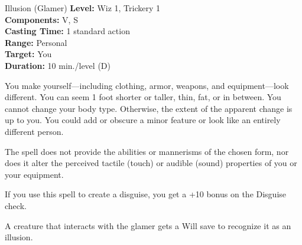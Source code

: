 {Illusion (Glamer)}
{
	\textbf{Level:}
	Wiz 1, Trickery 1\\
	\textbf{Components:}
	V, S\\
	\textbf{Casting Time:}
	1 standard action\\
	\textbf{Range:}
	Personal\\
	\textbf{Target:}
	You\\
	\textbf{Duration:}
	10 min./level (D)\\
}
{
	You make yourself---including clothing, armor, weapons, and equipment---look different. You can seem 1 foot shorter or taller, thin, fat, or in between. You cannot change your body type. Otherwise, the extent of the apparent change is up to you. You could add or obscure a minor feature or look like an entirely different person.

	The spell does not provide the abilities or mannerisms of the chosen form, nor does it alter the perceived tactile (touch) or audible (sound) properties of you or your equipment.

	If you use this spell to create a disguise, you get a +10 bonus on the Disguise check.

	A creature that interacts with the glamer gets a Will save to recognize it as an illusion.

}
